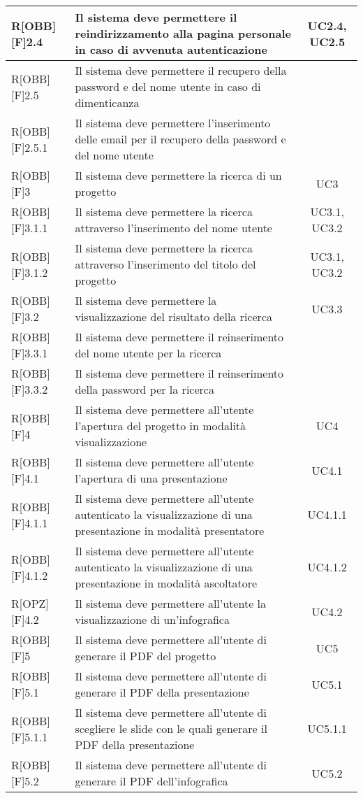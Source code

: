 \begin{longtable}{|l|p{}|c|}
		R[OBB][F]2.4 & Il sistema deve permettere il reindirizzamento alla pagina personale in caso di avvenuta autenticazione & UC2.4, UC2.5 \\ \midrule
		R[OBB][F]2.5 & Il sistema deve permettere il recupero della password e del nome utente in caso di dimenticanza & \\ \midrule
		R[OBB][F]2.5.1 & Il sistema deve permettere l'inserimento delle email per il recupero della password e del nome utente & \\ \midrule
		
		R[OBB][F]3 & Il sistema deve permettere la ricerca di un progetto  & UC3 \\ \midrule
		R[OBB][F]3.1.1 & Il sistema deve permettere la ricerca attraverso l'inserimento del nome utente & UC3.1, UC3.2 \\ \midrule
		R[OBB][F]3.1.2 & Il sistema deve permettere la ricerca attraverso l'inserimento del titolo del progetto & UC3.1, UC3.2 \\ \midrule
		R[OBB][F]3.2 & Il sistema deve permettere la visualizzazione del risultato della ricerca & UC3.3 \\ \midrule
		R[OBB][F]3.3.1 & Il sistema deve permettere il reinserimento del nome utente per la ricerca &  \\ \midrule
		R[OBB][F]3.3.2 & Il sistema deve permettere il reinserimento della password per la ricerca &  \\ \midrule
		
		R[OBB][F]4 & Il sistema deve permettere all'utente l'apertura del progetto in modalità visualizzazione & UC4 \\ \midrule
		R[OBB][F]4.1 & Il sistema deve permettere all'utente l'apertura di una presentazione & UC4.1 \\ \midrule
		R[OBB][F]4.1.1 & Il sistema deve permettere all'utente autenticato la visualizzazione di una presentazione in modalità presentatore & UC4.1.1 \\ \midrule
		R[OBB][F]4.1.2 & Il sistema deve permettere all'utente autenticato la visualizzazione di una presentazione in modalità ascoltatore & UC4.1.2 \\ \midrule
		R[OPZ][F]4.2 & Il sistema deve permettere all'utente la visualizzazione di un'infografica & UC4.2 \\ \midrule
		
		R[OBB][F]5 & Il sistema deve permettere all'utente di generare il PDF del progetto & UC5 \\ \midrule
		R[OBB][F]5.1 & Il sistema deve permettere all'utente di generare il PDF della presentazione & UC5.1 \\ \midrule
		R[OBB][F]5.1.1 & Il sistema deve permettere all'utente di scegliere le slide con le quali generare il PDF della presentazione & UC5.1.1 \\ \midrule
		R[OBB][F]5.2 & Il sistema deve permettere all'utente di generare il PDF dell'infografica & UC5.2 \\ \midrule
		

\end{longtable}

